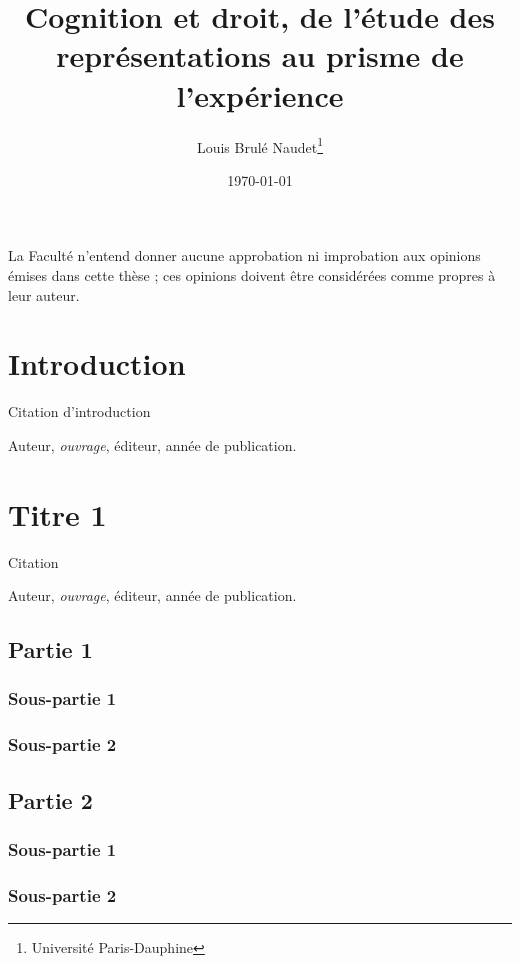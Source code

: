 \documentclass[french, 12pt]{report}
\title{Cognition et droit, de l'étude des représentations au prisme de l'expérience}
\author{Louis Brulé Naudet\thanks{Université Paris-Dauphine}}
\date{\today}
\begin{document}
{
\sloppy

\newpage
\thispagestyle{empty}
\begin{center}

\vspace*{17.3cm}
La Faculté n’entend donner aucune approbation ni improbation aux opinions émises dans cette thèse ; ces opinions doivent être considérées comme propres à leur auteur. 
\end{center}
\nobibliography*

\setcounter{page}{1} 


\chapter*{Introduction}
\og Citation d'introduction\fg\par

\textemdash Auteur, \emph{ouvrage}, éditeur, année de publication.\par
\vspace{0.8cm}

\newpage

\chapter{Titre 1}
\flushbottom
{}
\og Citation\fg{}\par
\textemdash Auteur, \emph{ouvrage}, éditeur, année de publication.\par
\vspace{0.8cm}

\section{Partie 1}
\subsection{Sous-partie 1}
\subsection{Sous-partie 2}

\section{Partie 2}
\subsection{Sous-partie 1}
\subsection{Sous-partie 2}

}
\end{document}
